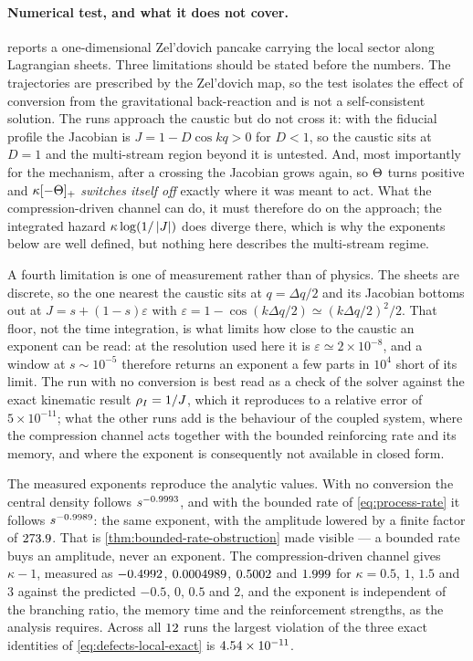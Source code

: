 \paragraph{Numerical test, and what it does not cover.}
 reports a one-dimensional Zel'dovich pancake carrying the
local sector along Lagrangian sheets. Three limitations should be stated before
the numbers. The trajectories are prescribed by the Zel'dovich map, so the test
isolates the effect of conversion from the gravitational back-reaction and is
not a self-consistent solution. The runs approach the caustic but do not cross
it: with the fiducial profile the Jacobian is $J=1-D\cos kq>0$ for $D<1$, so
the caustic sits at $D=1$ and the multi-stream region beyond it is untested.
And, most importantly for the mechanism, after a crossing the Jacobian grows
again, so $\Theta$ turns positive and $\kappa[-\Theta]_+$ \emph{switches itself
off} exactly where it was meant to act. What the compression-driven channel can
do, it must therefore do on the approach; the integrated hazard
$\kappa\log(1/\left|J\right|)$ does diverge there, which is why the exponents below are
well defined, but nothing here describes the multi-stream regime.

A fourth limitation is one of measurement rather than of physics. The sheets
are discrete, so the one nearest the caustic sits at $q=\Delta q/2$ and its
Jacobian bottoms out at $J=s+(1-s)\varepsilon$ with
$\varepsilon=1-\cos(k\Delta q/2)\simeq(k\Delta q/2)^2/2$. That floor, not the
time integration, is what limits how close to the caustic an exponent can be
read: at the resolution used here it is $\varepsilon\simeq2\times10^{-8}$, and
a window at $s\sim10^{-5}$ therefore returns an exponent a few parts in $10^4$
short of its limit. The run with no conversion is best read as a check of the
solver against the exact kinematic result $\rho_{I}=1/J$, which it reproduces to a
relative error of $5\times10^{-11}$; what the other runs add is the behaviour of
the coupled system, where the compression channel acts together with the
bounded reinforcing rate and its memory, and where the exponent is consequently
not available in closed form.

The measured exponents reproduce the analytic values. With no conversion the
central density follows $s^{-0.9993}$, and with the bounded
rate of \cref{eq:process-rate} it follows $s^{-0.9989}$:
the same exponent, with the amplitude lowered by a finite factor of
$273.9$. That is
\cref{thm:bounded-rate-obstruction} made visible --- a bounded rate buys an
amplitude, never an exponent. The compression-driven channel gives $\kappa-1$,
measured as $-0.4992$,
$0.0004989$,
$0.5002$ and
$1.999$ for $\kappa=0.5$, $1$, $1.5$ and $3$
against the predicted $-0.5$, $0$, $0.5$ and $2$, and the exponent is
independent of the branching ratio, the memory time and the reinforcement
strengths, as the analysis requires. Across all
$12$ runs the largest violation of the three exact
identities of \cref{eq:defects-local-exact} is
$\num{4.54e-11}$.

